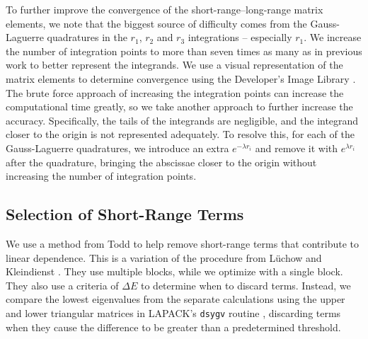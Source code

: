 \documentclass[preprint,showpacs,showkeys,preprintnumbers,amsmath,amssymb,longbibliography,pra,aps]{revtex4-1}
\begin{document}
{To further improve the convergence of the short-range--long-range matrix 
elements, we note that the biggest source of difficulty
comes from the Gauss-Laguerre quadratures in the $r_1$, $r_2$ and $r_3$ 
integrations -- especially $r_1$. We increase the number of integration 
points to more than seven times as many as in previous work
\cite{VanReeth2003,VanReeth2004} to better represent the integrands. We use
a visual representation of the matrix elements to determine convergence using
the Developer's Image Library \cite{DevIL}. The brute force approach
of increasing the integration points
can increase the computational time greatly, so we take another approach to 
further increase the accuracy. Specifically, the tails of the integrands are 
negligible, and the integrand closer to the origin is not represented 
adequately. To resolve this, for each of the Gauss-Laguerre quadratures, we 
introduce an extra $e^{-\lambda r_i}$ and remove it with $e^{\lambda r_i}$ 
after the quadrature, bringing the abscissae closer to the origin without 
increasing the number of integration points.

\subsection{Selection of Short-Range Terms}
\label{sec:Truncation}
We use a method from Todd \cite{Todd2007} to help remove short-range terms that
contribute to linear dependence. This is a variation of the procedure from
L\"uchow and Kleindienst \cite{Luchow1992}. They use multiple blocks, while we 
optimize with a single block. They also use a criteria of $\Delta E$ to 
determine when to discard terms. Instead, we compare the lowest eigenvalues 
from the separate calculations using the upper and lower triangular matrices 
in LAPACK's \texttt{dsygv} routine \cite{LAPACK}, discarding terms when they 
cause the difference to be greater than a predetermined threshold.

}
\end{document}
